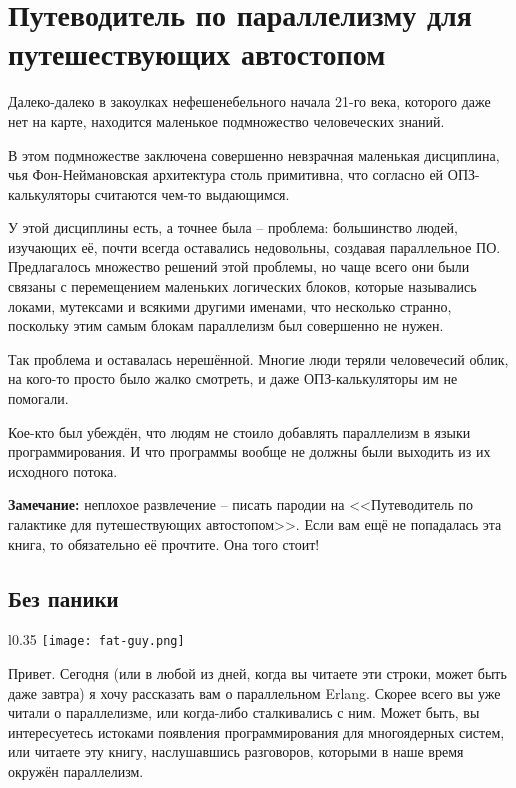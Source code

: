 \chapter{Путеводитель по параллелизму для путешествующих автостопом}
\label{the-hitchhikers-guide-to-concurrency}
Далеко\--далеко в закоулках нефешенебельного начала 21\--го века, которого даже нет на карте, находится маленькое подмножество человеческих знаний.

В этом подмножестве заключена совершенно невзрачная маленькая дисциплина, чья Фон\--Неймановская архитектура столь примитивна, что согласно ей ОПЗ\--калькуляторы считаются чем\--то выдающимся.

У этой дисциплины есть, а точнее была \--- проблема: большинство людей, изучающих её, почти всегда оставались недовольны, создавая параллельное ПО.
Предлагалось множество решений этой проблемы, но чаще всего они были связаны с перемещением маленьких логических блоков, которые назывались локами, мутексами и всякими другими именами, что несколько странно, поскольку этим самым блокам параллелизм был совершенно не нужен.

Так проблема и оставалась нерешённой.
Многие люди теряли человечесий облик, на кого-то просто было жалко смотреть, и даже ОПЗ\--калькуляторы им не помогали.

Кое\--кто был убеждён, что людям не стоило добавлять параллелизм в языки программирования.
И что программы вообще не должны были выходить из их исходного потока.
\\
\colorbox{lgray}
{
\begin{minipage}{1.0\linewidth}
    \textbf{Замечание:} неплохое развлечение \--- писать пародии на <<Путеводитель по галактике для путешествующих автостопом>>.
    Если вам ещё не попадалась эта книга, то обязательно её прочтите.
    Она того стоит!
\end{minipage}
}
\section{Без паники}
\label{dont-panic}
\begin{wrapfigure}{l}{0.35\linewidth}
    \texttt{[image: fat-guy.png]}
\end{wrapfigure}
Привет.
Сегодня (или в любой из дней, когда вы читаете эти строки, может быть даже завтра) я хочу рассказать вам о параллельном Erlang.
Скорее всего вы уже читали о параллелизме, или когда\--либо сталкивались с ним.
Может быть, вы интересуетесь истоками появления программирования для многоядерных систем, или читаете эту книгу, наслушавшись разговоров, которыми в наше время окружён параллелизм.

